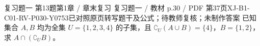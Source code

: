 \par\noindent\begin{minipage}{\linewidth}
\begin{bankitem}{复习题一 第13题}{第1章 / 章末复习 复习题一 / 教材 p.30 / PDF 第37页}{XJ-B1-C01-RV-P030-Y0753}{已对照原页转写题干及公式；待教师复核；未制作答案}
已知集合 $A,B$ 均为全集 $U=\{1,2,3,4\}$ 的子集，且 $\complement_U(A\cup B)=\{4\}$，$B=\{1,2\}$，求 $A\cap(\complement_U B)$。
\end{bankitem}
\end{minipage}\par\medskip
